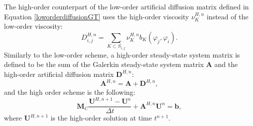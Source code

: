 The high-order counterpart of the low-order artificial diffusion matrix defined
in Equation \eqref{loworderdiffusionGT} uses the high-order viscosity $\nu_K^{H,n}$
instead of the low-order viscosity:
\begin{equation}
   D^{H,n}_{i,j} = \sum\limits_{K\subset S_{i,j}}\nu_K^{H,n} b_K(\varphi_j,\varphi_i).
\end{equation}
Similarly to the low-order scheme, a high-order steady-state system matrix is
defined to be the sum of the Galerkin steady-state system matrix $\mathbf{A}$ and the
high-order artificial diffusion matrix $\mathbf{D}^{H,n}$:
\begin{equation}
   \mathbf{A}^{H,n} = \mathbf{A} + \mathbf{D}^{H,n},
\end{equation}
and the high order scheme is the following:
\begin{equation}\label{gthighorderscheme}
   \mathbf{M}_C\frac{\mathbf{U}^{H,n+1}-\mathbf{U}^n}{\Delta t}
      +\mathbf{A}^{H,n}\mathbf{U}^n = \mathbf{b},
\end{equation}
where $\mathbf{U}^{H,n+1}$ is the high-order solution at time $t^{n+1}$.